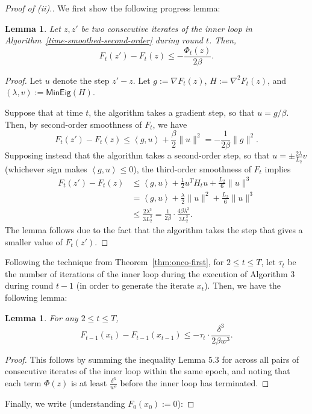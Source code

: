 \documentclass{article}
\def\norm#1{\mathopen\| #1 \mathclose\|}
\newcommand{\ang}[1]{\left<#1\right>}
\newtheorem{lemma}[theorem]{Lemma}
\begin{document}
\begin{proof}[Proof of (ii).] We first show the following progress lemma:
\begin{lemma}
\label{lem:second-order-progress}
Let $z, z'$ be two consecutive iterates of the inner loop in Algorithm~\ref{time-smoothed-second-order} during round $t$. Then,
\[F_t(z') - F_t(z) \leq -\frac{\Phi_t(z)}{2\beta}.\]
\end{lemma}
\begin{proof}
Let $u$ denote the step $z' - z$. Let $g := \nabla F_t(z)$, $H := \nabla^2 F_t(z)$, and $(\lambda, v) := \mathsf{MinEig}(H)$.

Suppose that at time $t$, the algorithm takes a gradient step, so that $u = g/\beta$. Then, by second-order smoothness of $F_t$, we have
\[F_t(z') - F_t(z) \leq \ang{g, u} + \frac{\beta}{2}\norm{u}^2 = -\frac{1}{2\beta} \norm{g}^2.\]
Supposing instead that the algorithm takes a second-order step, so that $u = \pm \frac{2\lambda}{L_2} v$ (whichever sign makes $\ang{g,u} \leq 0$), the third-order smoothness of $F_t$ implies
\begin{align*}
F_{t}(z') - F_{t}(z) &\leq \ang{ g, u } + \frac{1}{2} u^T H_t u + \frac{L_2}{6}\norm{u}^3 \\
&= \ang{ g, u } + \frac{\lambda}{2} \norm{u}^2 + \frac{L_2}{6}\norm{u}^3 \\
&\leq \frac{2\lambda^3}{3L_2^2} = \frac{1}{2\beta} \cdot \frac{4\beta\lambda^3}{3L_2^2}.
\end{align*}
The lemma follows due to the fact that the algorithm takes the step that gives a smaller value of $F_t(z')$.
\end{proof}
Following the technique from Theorem~\ref{thm:onco-first}, for $2 \leq t \leq T$, let $\tau_t$ be the number of iterations of the inner loop during the execution of Algorithm 3 during round $t-1$ (in order to generate the iterate $x_t$). Then, we have the following lemma:
\begin{lemma}
\label{lem:second-order-tau}
For any $2 \leq t \leq T$,
\[F_{t-1}(x_t) - F_{t-1}(x_{t-1}) \leq -\tau_t \cdot \frac{\delta^3}{2\beta w^3}. \]
\end{lemma}
\begin{proof}
This follows by summing the inequality Lemma 5.3 for across all pairs of consecutive iterates of the inner loop within the same epoch, and noting that each term $\Phi(z)$ is at least $\frac{\delta^3}{w^3}$ before the inner loop has terminated.
\end{proof}
Finally, we write (understanding $F_0(x_0) := 0$):

\end{proof}
\end{document}
